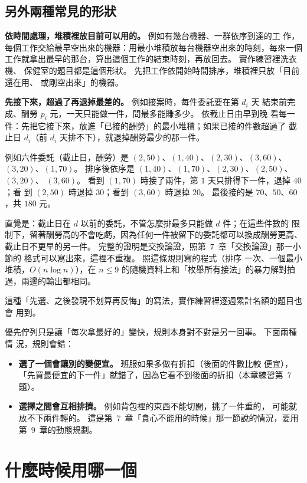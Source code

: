 \subsection{另外兩種常見的形狀}

\textbf{依時間處理，堆積裡放目前可以用的。} 例如有幾台機器、一群依序到達的工
作，每個工作交給最早空出來的機器：用最小堆積放每台機器空出來的時刻，每來一個
工作就拿出最早的那台，算出這個工作的結束時刻，再放回去。 實作練習裡洗衣機、
保健室的題目都是這個形狀。 先把工作依開始時間排序，堆積裡只放「目前還在用、
或剛空出來」的機器。

\textbf{先接下來，超過了再退掉最差的。} 例如接案時，每件委託要在第 $d_i$ 天
結束前完成、酬勞 $p_i$ 元，一天只能做一件，問最多能賺多少。 依截止日由早到晚
看每一件：先把它接下來，放進「已接的酬勞」的最小堆積；如果已接的件數超過了
截止日 $d_i$（前 $d_i$ 天排不下），就退掉酬勞最少的那一件。

例如六件委託（截止日，酬勞）是 $(2, 50)$、$(1, 40)$、$(2, 30)$、$(3, 60)$、
$(3, 20)$、$(1, 70)$。 排序後依序是 $(1, 40)$、$(1, 70)$、$(2, 30)$、$(2, 50)$、$(3, 20)$、
$(3, 60)$。 看到 $(1, 70)$ 時接了兩件，第 $1$ 天只排得下一件，退掉 $40$；看
到 $(2, 50)$ 時退掉 $30$；看到 $(3, 60)$ 時退掉 $20$。 最後接的是
$70$、$50$、$60$，共 $180$ 元。

直覺是：截止日在 $d$ 以前的委託，不管怎麼排最多只能做 $d$ 件；在這些件數的
限制下，留著酬勞高的不會吃虧，因為任何一件被留下的委託都可以換成酬勞更高、
截止日不更早的另一件。 完整的證明是交換論證，照第~7~章「交換論證」那一小節的
格式可以寫出來，這裡不重複。 照這條規則寫的程式（排序
一次、一個最小堆積，$O(n \log n)$），在 $n \le 9$ 的隨機資料上和「枚舉所有接法」的暴力解對拍過，兩邊的輸出都相同。

這種「先選、之後發現不划算再反悔」的寫法，實作練習裡逐週累計名額的題目也會
用到。

優先佇列只是讓「每次拿最好的」變快，規則本身對不對是另一回事。 下面兩種情
況，規則會錯：

\begin{itemize}
\item \textbf{選了一個會讓別的變便宜。} 班服如果多做有折扣（後面的件數比較
便宜），「先買最便宜的下一件」就錯了，因為它看不到後面的折扣（本章練習第~7~
題）。
\item \textbf{選擇之間會互相排擠。} 例如背包裡的東西不能切開，挑了一件重的，
可能就放不下兩件輕的。 這是第~7~章「貪心不能用的時候」那一節說的情況，要用
第~9~章的動態規劃。
\end{itemize}

\section{什麼時候用哪一個}
\label{sec:which-container}

